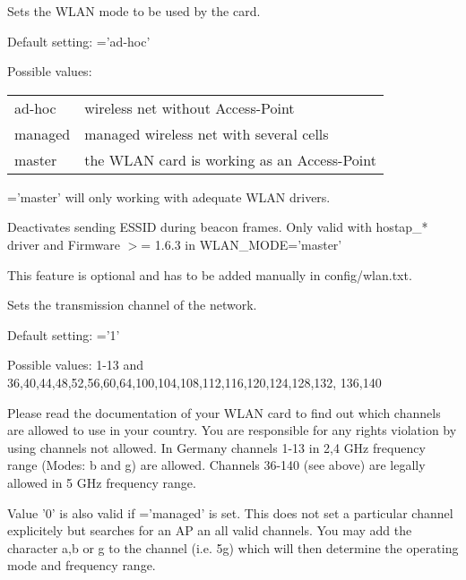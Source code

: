 \begin{description}

        Sets the WLAN mode to be used by the card.

        Default setting: ='ad-hoc'

        Possible values:

        \begin{tabular}[h]{ll}
            ad-hoc        & wireless net without Access-Point \\
            managed       & managed wireless net with several cells\\
            master        & the WLAN card is working as an Access-Point\\
        \end{tabular}

        ='master' will only working with adequate WLAN drivers.


        Deactivates sending ESSID during beacon frames.
        Only valid with hostap\_* driver and Firmware $>$= 1.6.3 in WLAN\_MODE='master'

        This feature is optional and has to be added manually in config/wlan.txt.


        Sets the transmission channel of the network.

        Default setting: ='1'

        Possible values: 1-13 and 36,40,44,48,52,56,60,64,100,104,108,112,116,120,124,128,132, 136,140

        Please read the documentation of your WLAN card to find out which 
        channels are allowed to use in your country. You are responsible 
        for any rights violation by using channels not allowed. In Germany 
        channels 1-13 in 2,4 GHz frequency range (Modes: b and g) are allowed.
        Channels 36-140 (see above) are legally allowed in 5 GHz frequency range.
    
        Value '0' is also valid if ='managed' is set. This 
        does not set a particular channel explicitely but searches for an AP an all 
        valid channels.
        You may add the character a,b or g to the channel (i.e. 5g) which will then 
        determine the operating mode and frequency range.


\end{description}

